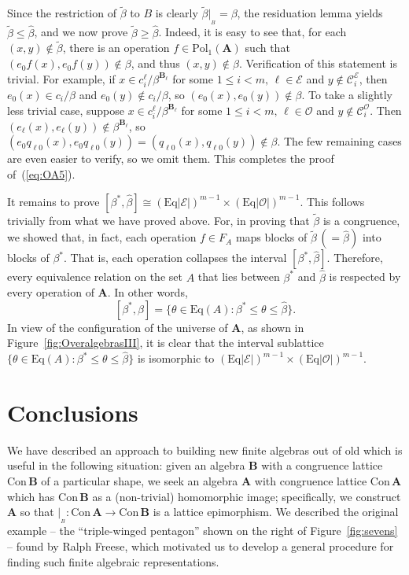 \documentclass[cm,dissertation,actual,final]{uhthesis}
\theoremstyle{plain}
\theoremstyle{definition}
\theoremstyle{remark}
\numberwithin{theorem}{section}
\numberwithin{claim}{chapter}
\numberwithin{equation}{section}
\numberwithin{conjecture}{chapter}
\newcommand{\<}{\ensuremath{\langle}}
\renewcommand{\>}{\ensuremath{\rangle}}
\renewcommand{\leq}{\ensuremath{\leqslant}}
\renewcommand{\geq}{\ensuremath{\geqslant}}
\newcommand{\Eq}{\ensuremath{\mathrm{Eq}}}
\newcommand{\Con}{\ensuremath{\mathrm{Con\,}}}
\newcommand{\Pol}{\ensuremath{\mathrm{Pol}}}
\newcommand{\0}{\ensuremath{\mathbf{0}}}
\newcommand{\1}{\ensuremath{\mathbf{1}}}
\newcommand{\2}{\ensuremath{\mathbf{2}}}
\newcommand{\3}{\ensuremath{\mathbf{3}}}
\newcommand{\4}{\ensuremath{\mathbf{4}}}
\newcommand{\5}{\ensuremath{\mathbf{5}}}
\newcommand{\bA}{\ensuremath{\mathbf{A}}}
\newcommand{\bB}{\ensuremath{\mathbf{B}}}
\newcommand{\sC}{\ensuremath{\mathscr{C}}}
\newcommand{\sE}{\ensuremath{\mathscr{E}}}
\newcommand{\sO}{\ensuremath{\mathscr{O}}}
\newcommand{\resB}{\ensuremath{|_{_B}}}
\newcommand{\tbeta}{\ensuremath{\widetilde{\beta}}}
\newcommand{\hbeta}{\ensuremath{\widehat{\beta}}}
\newcommand{\CE}{\ensuremath{\sC_i^{\sE}}}
\newcommand{\CO}{\ensuremath{\sC_i^{\sO}}}
\begin{document}
Since the
restriction of $\tbeta$ to $B$ is clearly $\tbeta \resB = \beta$, the
residuation lemma yields $\tbeta \leq \hbeta$, and we now prove
$\tbeta \geq \hbeta$.  Indeed, it is easy to see that, for each $(x,y)\notin
\tbeta$, there is an operation $f\in \Pol_1(\bA)$ such that $(e_0f(x),
e_0f(y))\notin \beta$, and thus $(x,y)\notin \hbeta$.  Verification of this
statement is trivial.  For example, if 
$x\in c_i^\ell/\beta^{\bB_\ell}$ 
for some $1\leq i < m, \, \ell \in \sE$
and $y\notin \CE$, then $e_0(x) \in c_i/\beta$ and $e_0(y)\notin c_i/\beta$,
so 
$(e_0(x), e_0(y))\notin \beta$.  To take a slightly less trivial case, suppose 
$x\in c_i^\ell/\beta^{\bB_\ell}$ 
for some $1\leq i < m, \, \ell \in \sO$
and $y\notin \CO$.  Then $(e_{\ell}(x), e_{\ell}(y))\notin \beta^{\bB_\ell}$,
so $(e_0q_{\ell 0}(x), e_0q_{\ell 0}(y)) = (q_{\ell 0}(x), q_{\ell 0}(y)) \notin
\beta$.  The few remaining cases are even easier to verify, so we omit them.
This completes the proof of~(\ref{eq:OA5}).

It remains to prove
$[\beta^*, \widehat{\beta}] \cong (\Eq|\sE|)^{m-1} \times (\Eq|\sO|)^{m-1}$. 
This follows trivially from what we have proved above.  For,
in proving that $\tbeta$ is a congruence, we showed that, in fact, each
operation $f\in F_A$ maps blocks of $\tbeta \, (= \hbeta)$ into blocks of $\beta^*$.  That is,
each operation collapses the interval $[\beta^*, \hbeta]$.  Therefore, every
equivalence relation on the set $A$ that lies between $\beta^*$ and $\hbeta$ is
respected by every operation of $\bA$. In other words,
\[
  [\beta^*, \hbeta] = \{\theta \in \Eq(A): \beta^* \leq \theta \leq \hbeta\}.
  \]
  In view of the configuration of the universe of $\bA$, 
  as shown in Figure~\ref{fig:OveralgebrasIII},
  it is clear that the interval sublattice 
  $\{\theta \in \Eq(A): \beta^* \leq \theta \leq \hbeta\}$
  is isomorphic to $(\Eq|\sE|)^{m-1} \times (\Eq|\sO|)^{m-1}$. 
  \hfill \qedsymbol

  \section{Conclusions}
  We have described an approach to building new finite algebras out of old
  which is useful in the following situation: given an algebra $\bB$ with a
  congruence lattice $\Con \bB$ of a particular shape, we seek an algebra
  $\bA$ with congruence lattice $\Con \bA$ which has $\Con \bB$ as a
  (non-trivial) homomorphic image; specifically, we construct
  $\bA$ so that $\resB : \Con \bA \rightarrow \Con \bB$ is a lattice epimorphism.
  We described the original example -- the ``triple-winged pentagon'' shown on
  the right of Figure~\ref{fig:sevens} -- found by 
%
Ralph Freese, which 
  motivated us to develop a general procedure for finding such finite algebraic
  representations.
\end{document}
